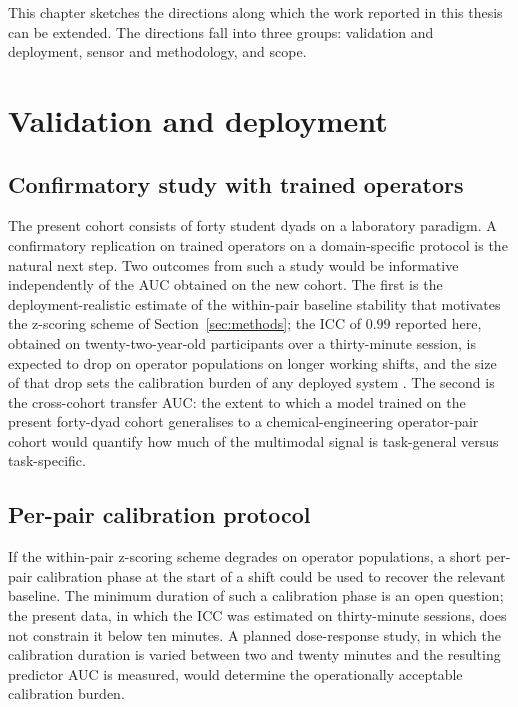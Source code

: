 This chapter sketches the directions along which the work reported in this thesis can be extended. The directions fall into three groups: validation and deployment, sensor and methodology, and scope.

\section{Validation and deployment}

\subsection{Confirmatory study with trained operators}

The present cohort consists of forty student dyads on a laboratory paradigm. A confirmatory replication on trained operators on a domain-specific protocol is the natural next step. Two outcomes from such a study would be informative independently of the AUC obtained on the new cohort. The first is the deployment-realistic estimate of the within-pair baseline stability that motivates the z-scoring scheme of Section~\ref{sec:methods}; the ICC of $0.99$ reported here, obtained on twenty-two-year-old participants over a thirty-minute session, is expected to drop on operator populations on longer working shifts, and the size of that drop sets the calibration burden of any deployed system \cite{koenig2016sex,quintana2016guidelines,shaffer2017hrv,shaffer2014healthy,laborde2017hrv}. The second is the cross-cohort transfer AUC: the extent to which a model trained on the present forty-dyad cohort generalises to a chemical-engineering operator-pair cohort would quantify how much of the multimodal signal is task-general versus task-specific.

\subsection{Per-pair calibration protocol}

If the within-pair z-scoring scheme degrades on operator populations, a short per-pair calibration phase at the start of a shift could be used to recover the relevant baseline. The minimum duration of such a calibration phase is an open question; the present data, in which the ICC was estimated on thirty-minute sessions, does not constrain it below ten minutes. A planned dose-response study, in which the calibration duration is varied between two and twenty minutes and the resulting predictor AUC is measured, would determine the operationally acceptable calibration burden.

